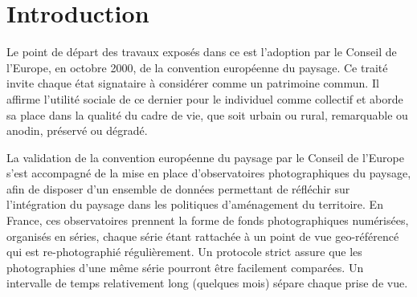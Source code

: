 
\chapter{Introduction}


Le point de départ des travaux exposés dans ce  est l'adoption par le Conseil de l'Europe, en octobre 2000, de la convention européenne du paysage. Ce traité invite chaque état signataire à considérer  comme un patrimoine commun. Il affirme l'utilité sociale de ce dernier pour le  individuel comme collectif et aborde sa place dans la qualité du cadre de vie, que  soit urbain ou rural, remarquable ou anodin, préservé ou dégradé. 

La validation de la convention européenne du paysage par le Conseil de l'Europe s'est accompagné de la mise en place d’observatoires photographiques du paysage, afin de disposer d'un ensemble de données  permettant de réfléchir sur l'intégration du paysage dans les politiques d'aménagement du territoire. En France, ces observatoires prennent la forme de fonds photographiques numérisées, organisés en séries, chaque série étant rattachée à un point de vue geo-référencé qui est re-photographié régulièrement. Un protocole strict assure que les photographies d'une même série pourront être facilement comparées. Un intervalle de temps relativement long (quelques mois) sépare chaque prise de vue. 

